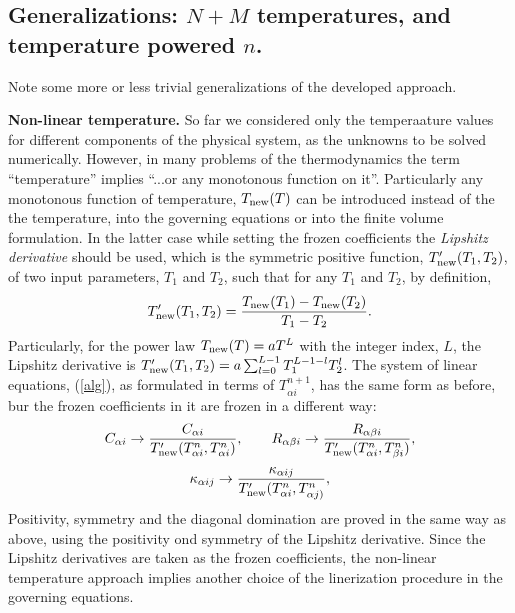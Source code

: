\subsection{Generalizations: $N+M$ temperatures, and temperature powered $n$.}
Note some more or less trivial generalizations of the developed approach. 

{\bf Non-linear temperature.} So far we considered only the temperaature values for different components of the physical system, as the unknowns to be solved 
numerically. However, in many problems of the thermodynamics the term ``temperature'' implies ``...or any monotonous function on it''. Particularly any 
monotonous function of temperature, $T_{\rm new}(T)$ can be introduced instead of the the temperature, into the governing equations or into the finite volume 
formulation. In the latter 
case while setting the frozen coefficients the {\it Lipshitz derivative} should be used, which is the symmetric positive function, $T_{\rm new}^\prime(T_1,T_2)$, of two 
input parameters, $T_1$ and $T_2$, such that for any $T_1$ and $T_2$, by definition,
\begin{equation}
T^\prime_{\rm new}(T_1,T_2)=\frac{T_{\rm new}(T_1)-T_{\rm new}(T_2)}{T_1-T_2}.
\end{equation}   
Particularly, for the power law $T_{\rm new}(T)=aT^L$ with the integer index, $L$, the Lipshitz derivative is 
$T_{\rm new}^\prime(T_1,T_2)=a\sum_{l=0}^{L-1}{T^{L-1-l}_1T_2^l}$. The system of linear equations, (\ref{alg}), as formulated in terms of $T^{n+1}_{\alpha i}$, has the 
same form as before, bur the frozen coefficients in it are frozen in a different way:
\begin{equation}
C_{\alpha i}\rightarrow \frac{C_{\alpha i}}
{T^\prime_{\rm new}(T^n_{\alpha i},T^n_{\alpha i})},\qquad
R_{\alpha\beta i}\rightarrow \frac{R_{\alpha\beta i}}
{T^\prime_{\rm new}(T^n_{\alpha i},T^n_{\beta i})},
\end{equation} 
\begin{equation}
\kappa_{\alpha ij}\rightarrow \frac{\kappa_{\alpha ij}}
{T^\prime_{\rm new}(T^n_{\alpha i},T^n_{\alpha j)}},
\end{equation}
Positivity, symmetry and the diagonal domination are proved in the same way as above, using the positivity ond symmetry of the Lipshitz derivative. Since the
Lipshitz derivatives are taken as the frozen coefficients, the non-linear temperature approach implies another choice of the linerization procedure in the 
governing equations. 


